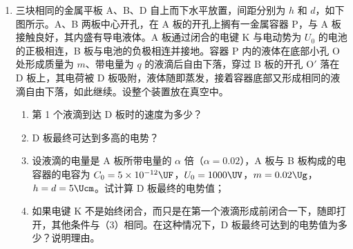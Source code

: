 \documentclass[\gkver]{gaokaozhenti}
\begin{document}
\begin{enumerate}
{\onepicture[align=right, h=2.55cm]{}

（3）$mgr\cos\theta - mg\cdot\frac{r}{2}(1 + \sin\theta) = 0$　③

$2\cos\theta = 1 + \sin\theta$，

$4(1 - \sin^{2}\theta) = 1 + \sin^{2}\theta + 2\sin\theta$

$5\sin^{2}\theta + 2\sin\theta - 3 = 0$

$\sin\theta = \frac{-1 \pm \sqrt{1 + 15}}{5} = \frac{3}{5}$（舍去负根）

$\theta = 37^\circ$

\textbf{评分标准}：第（1）小题 3 分。第（2）小题 5 分，列出② 3 分，得出结果 2 分。第（3）小题 4 分，列出③ 2 分，得出 $\theta$ 结果 2 分。
}

\item
三块相同的金属平板 A、B、D 自上而下水平放置，间距分别为 $h$ 和 $d$，如下图所示。A、B 两板中心开孔，在 A 板的开孔上搁有一金属容器 P，与 A 板接触良好，其内盛有导电液体。A 板通过闭合的电键 K 与电动势为 $U_{0}$ 的电池的正极相连，B 板与电池的负极相连并接地。容器 P 内的液体在底部小孔 O 处形成质量为 $m$、带电量为 $q$ 的液滴后自由下落，穿过 B 板的开孔 O$'$ 落在 D 板上，其电荷被 D 板吸附，液体随即蒸发，接着容器底部又形成相同的液滴自由下落，如此继续。设整个装置放在真空中。
\begin{enumerate}
	\item
	第 1 个液滴到达 D 板时的速度为多少？
	\item
	D 板最终可达到多高的电势？
	\item
	设液滴的电量是 A 板所带电量的 $\alpha$ 倍（$\alpha = 0.02$），A 板与 B 板构成的电容器的电容为 $C_{0} = 5 \times 10^{-12}\UF$，$U_{0} = 1000\UV$，$m = 0.02\Ug$，$h = d = 5\Ucm$。试计算 D 板最终的电势值；
	\item
	如果电键 K 不是始终闭合，而只是在第一个液滴形成前闭合一下，随即打开，其他条件与（3）相同。在这种情况下，D 板最终可达到的电势值为多少？说明理由。
\end{enumerate}
\onepicture[align=right, w=5.60cm]{}
\end{enumerate}
\end{document}
